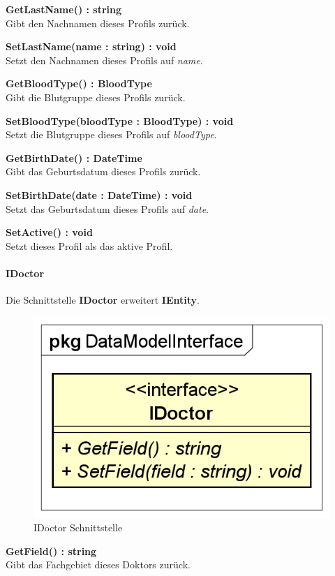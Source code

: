 \documentclass[a4paper]{scrreprt}
\begin{document}
\textbf{GetLastName() : string}\\
Gibt den Nachnamen dieses Profils zurück.

\textbf{SetLastName(name : string) : void}\\
Setzt den Nachnamen dieses Profils auf \textit{name}.

\textbf{GetBloodType() : BloodType}\\
Gibt die Blutgruppe dieses Profils zurück.

\textbf{SetBloodType(bloodType : BloodType) : void}\\
Setzt die Blutgruppe dieses Profils auf \textit{bloodType}.

\textbf{GetBirthDate() : DateTime}\\
Gibt das Geburtsdatum dieses Profils zurück.

\textbf{SetBirthDate(date : DateTime) : void}\\
Setzt das Geburtsdatum dieses Profils auf \textit{date}.

\textbf{SetActive() : void}\\
Setzt dieses Profil als das aktive Profil.

\paragraph{IDoctor}
Die Schnittstelle \textbf{IDoctor} erweitert \textbf{IEntity}.

\begin{figure}[H]
\centering
\includegraphics[width=0.45\textheight]{graphics/Klassendiagramme/Model/IDoctor.png}
\caption{IDoctor Schnittstelle}
\end{figure}
\textbf{GetField() : string}\\
Gibt das Fachgebiet dieses Doktors zurück.
\end{document}
